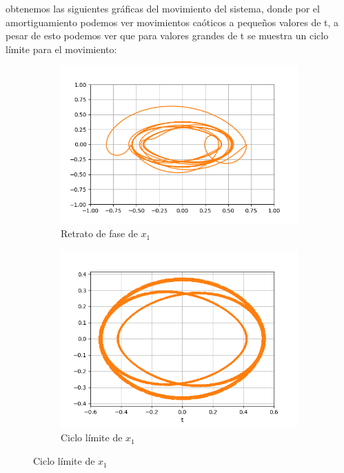 \documentclass{article}
\begin{document}
obtenemos las siguientes gráficas del movimiento del sistema, donde por el amortiguamiento podemos ver movimientos caóticos a pequeños valores de t, a pesar de esto podemos ver que para valores grandes de t se muestra un ciclo límite para el movimiento:

\begin{figure}[ht!]
	\begin{subfigure}[b]{0.5\linewidth}
    \raggedleft
	\includegraphics[width=\linewidth]{ejercicio41-phase-x1.png}
    \caption{Retrato de fase de $x_1$}
	\end{subfigure}
	\begin{subfigure}[b]{0.5\linewidth}
    \raggedright
	\includegraphics[width=\linewidth]{ejercicio41-limit-x1.png}
	\caption{Ciclo límite de $x_1$}
    \end{subfigure}
\end{figure}
\end{document}
